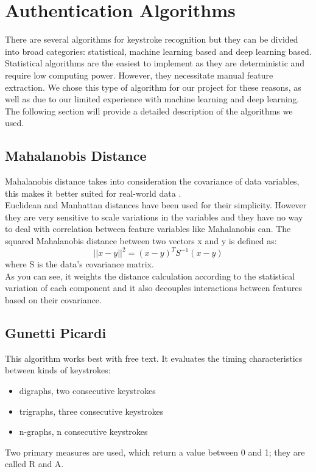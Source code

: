 \section{Authentication Algorithms}
There are several algorithms for keystroke recognition but they can be divided into broad categories: statistical, machine learning based and deep learning based.\\

Statistical algorithms are the easiest to implement as they are deterministic and require low computing power. However, they necessitate manual feature extraction. We chose this type of algorithm for our project for these reasons, as well as due to our limited experience with machine learning and deep learning. The following section will provide a detailed description of the algorithms we used.

\subsection{Mahalanobis Distance}
Mahalanobis distance takes into consideration the covariance of data variables, this makes it better suited for real-world data \cite{ref:mahalanobis}.\\

Euclidean and Manhattan distances have been used for their simplicity. However they are very sensitive to scale variations in the variables and they have no way to deal with correlation between feature variables like Mahalanobis can. The squared Mahalanobis distance between two vectors x and y is defined as:
\begin{equation}
    ||x-y||^2=(x-y)^TS^{-1}(x-y)
\end{equation}
where S is the data's covariance matrix.\\

As you can see, it weights the distance calculation according to the statistical variation of each component and it also decouples interactions between features based on their covariance.

\subsection{Gunetti Picardi}
\label{sec:gp}
This algorithm \cite{ref:gunetti picardi} works best with free text. It evaluates the timing characteristics between kinds of keystrokes:
\begin{itemize}
    \item digraphs, two consecutive keystrokes
    \item trigraphs, three consecutive keystrokes
    \item n-graphs, n consecutive keystrokes
\end{itemize}
Two primary measures are used, which return a value between 0 and 1; they are called R and A.\\


